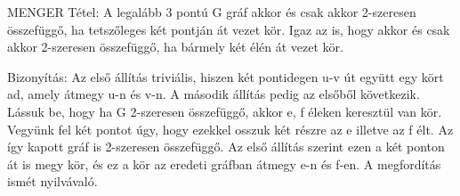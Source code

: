 \documentclass[]{article}
\begin{document}
\begin{framed}
MENGER Tétel: A legalább 3 pontú G gráf akkor és csak akkor 2-szeresen összefüggő, ha tetszőleges két pontján át vezet kör. Igaz az is, hogy akkor és csak akkor 2-szeresen összefüggő, ha bármely két élén át vezet kör.
\end{framed}
\begin{leftbar}
Bizonyítás: Az első állítás triviális, hiszen két pontidegen u-v út együtt egy kört ad, amely átmegy u-n és v-n. A második állítás pedig az elsőből következik. Lássuk be, hogy ha G 2-szeresen összefüggő, akkor e, f éleken keresztül van kör. Vegyünk fel két pontot úgy, hogy ezekkel osszuk két részre az e illetve az f élt. Az így kapott gráf is 2-szeresen összefüggő. Az első állítás szerint ezen a két ponton át is megy kör, és ez a kör az eredeti gráfban átmegy e-n és f-en. A megfordítás ismét nyilvávaló.
\end{leftbar}
\end{document}
